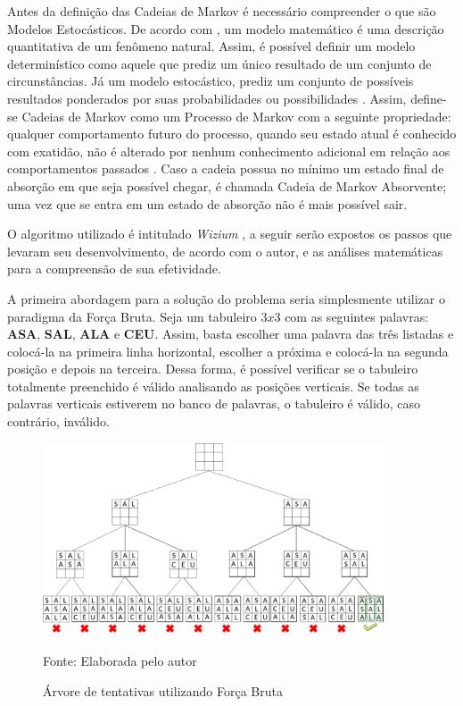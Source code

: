Antes da definição das Cadeias de Markov é necessário compreender o que são Modelos Estocásticos. De acordo com \cite{howard1998introduction}, um modelo matemático é uma descrição quantitativa de um fenômeno natural. Assim, é possível definir um modelo determinístico como aquele que prediz um único resultado de um conjunto de circunstâncias. Já um modelo estocástico, prediz um conjunto de possíveis resultados ponderados por suas probabilidades ou possibilidades \citep{howard1998introduction}. Assim, define-se Cadeias de Markov como um Processo de Markov com a seguinte propriedade: qualquer comportamento futuro do processo, quando seu estado atual é conhecido com exatidão, não é alterado por nenhum conhecimento adicional em relação aos comportamentos passados \citep{howard1998introduction}. Caso a cadeia possua no mínimo um estado final de absorção em que seja possível chegar, é chamada Cadeia de Markov Absorvente; uma vez que se entra em um estado de absorção não é mais possível sair. 



O algoritmo utilizado é intitulado \textit{Wizium} \citep{wizium}, a seguir serão expostos os passos que levaram seu desenvolvimento, de acordo com o autor, e as análises matemáticas para a compreensão de sua efetividade.

A primeira abordagem para a solução do problema seria simplesmente utilizar o paradigma da Força Bruta. Seja um tabuleiro $3x3$ com as seguintes palavras: \textbf{ASA}, \textbf{SAL}, \textbf{ALA} e \textbf{CEU}. Assim, basta escolher uma palavra das três listadas e colocá-la na primeira linha horizontal, escolher a próxima e colocá-la na segunda posição e depois na terceira. Dessa forma, é possível verificar se o tabuleiro totalmente preenchido é válido analisando as posições verticais. Se todas as palavras verticais estiverem no banco de palavras, o tabuleiro é válido, caso contrário, inválido. 

\begin{figure}[H]
\centering
    \caption{Árvore de tentativas utilizando Força Bruta}
    \label{fig:crossTree}
    \includegraphics[width=0.9\textwidth]{Figuras/crosswordsTree.png}
    
    Fonte: Elaborada pelo autor
\end{figure}


